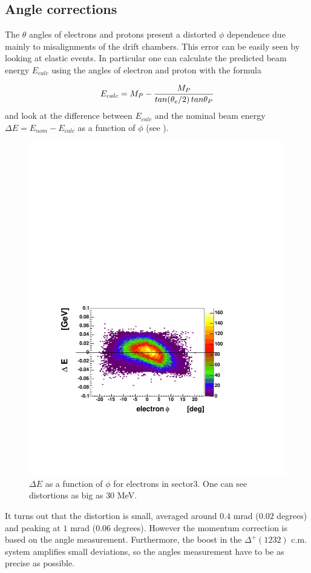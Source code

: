 \clearpage\newpage
\subsection{Angle corrections} 
The $\theta$ angles of electrons and protons present  
a distorted $\phi$ dependence due mainly to misalignments
of the drift chambers. This error can be easily seen by looking at elastic events.
In particular one can calculate the predicted beam energy $E_{calc}$ using the angles of electron and proton with the formula

\begin{equation}
 E_{calc} = M_P-\frac{\displaystyle M_P}{\displaystyle tan(\theta_e/2)\, tan\theta_P}
 \label{eqn:elastic_th}
\end{equation}
and look at the difference between $E_{calc}$ and the nominal beam energy $\Delta E = E_{nom}-E_{calc}$ 
as a function of $\phi$ (see ).

\begin{figure}[h]
 \begin{center}
  \includegraphics[width = 12cm, bb=40 130 500 440]{data_reduction/kine_corr/img/sector_3_energy}
  \caption[$\Delta E$ as a function of $\phi$ for electrons in sector3]
          { $\Delta E$ as a function of $\phi$ for electrons in sector3.
                     One can see distortions as big as $30$ MeV.}
 \label{fig:energy_sec3}
 \end{center}
\end{figure}
It turns out that the distortion is small, averaged around $0.4$ mrad ($0.02$ degrees) and 
peaking at $1$ mrad ($0.06$ degrees). However the momentum correction is based on the angle measurement.
Furthermore, the boost in the $\Delta^+(1232)$ c.m. system amplifies small deviations,
so the angles measurement have to be as precise as possible.

